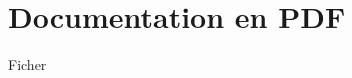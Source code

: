 \documentclass[letterpaper,10pt,french]{sphinxmanual}
\begin{document}
\chapter{Documentation en PDF}
\label{\detokenize{index:documentation-en-pdf}}
Ficher 


\renewcommand{\indexname}{Index des modules Python}
\begin{sphinxtheindex}
\let\bigletter\sphinxstyleindexlettergroup
\bigletter{s}
\item\relax{}
\end{sphinxtheindex}

\renewcommand{\indexname}{Index}
\printindex
\end{document}
